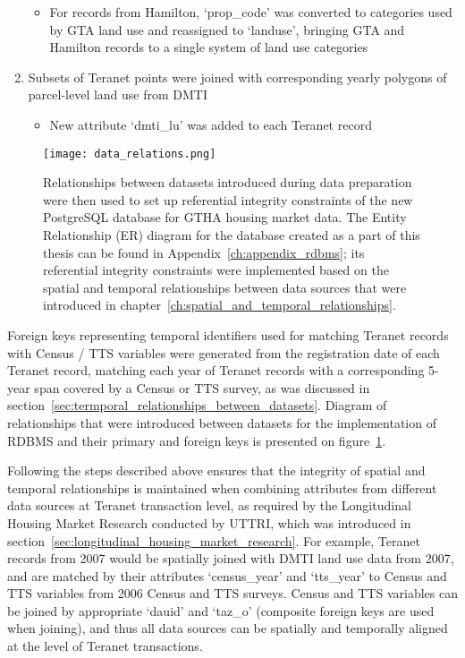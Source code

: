 \begin{enumerate}
\begin{itemize}
        \item For records from Hamilton, `prop\_code' was converted to categories used by GTA land use and reassigned to `landuse', bringing GTA and Hamilton records to a single system of land use categories
    \end{itemize}
    \item Subsets of Teranet points were joined with corresponding yearly polygons of parcel-level land use from DMTI
    \begin{itemize}
        \item New attribute `dmti\_lu' was added to each Teranet record
    \end{itemize}
\end{enumerate}

\begin{figure}[hbt!]
    \centering
    \texttt{[image: data\_relations.png]}
    \caption{Relationships between datasets introduced during data preparation were then used to set up referential integrity constraints of the new PostgreSQL database for GTHA housing market data.
    The Entity Relationship (ER) diagram for the database created as a part of this thesis can be found in Appendix~\ref{ch:appendix_rdbms};
    its referential integrity constraints were implemented based on the spatial and temporal relationships between data sources that were introduced in chapter~\ref{ch:spatial_and_temporal_relationships}.}
    \label{fig:data_relations}
\end{figure}

Foreign keys representing temporal identifiers used for matching Teranet records with Census / TTS variables were generated from the registration date of each Teranet record, matching each year of Teranet records with a corresponding 5-year span covered by a Census or TTS survey, as was discussed in section~\ref{sec:termporal_relationships_between_datasets}.
Diagram of relationships that were introduced between datasets for the implementation of RDBMS and their primary and foreign keys is presented on figure~\ref{fig:data_relations}.

Following the steps described above ensures that the integrity of spatial and temporal relationships is maintained when combining attributes from different data sources at Teranet transaction level, as required by the Longitudinal Housing Market Research conducted by UTTRI, which was introduced in section~\ref{sec:longitudinal_housing_market_research}.
For example, Teranet records from 2007 would be spatially joined with DMTI land use data from 2007, and are matched by their attributes `census\_year' and `tts\_year' to Census and TTS variables from 2006 Census and TTS surveys.
Census and TTS variables can be joined by appropriate `dauid' and `taz\_o' (composite foreign keys are used when joining), and thus all data sources can be spatially and temporally aligned at the level of Teranet transactions.

